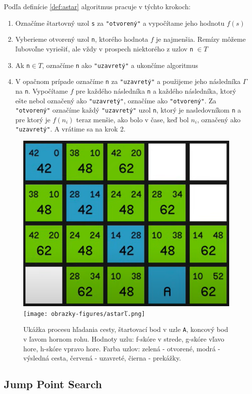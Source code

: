 \noindent
Podľa definície \ref{def:astar} algoritmus pracuje v týchto krokoch:
\begin{enumerate}
    \item Označíme štartovný uzol \verb|s| za \verb|"otvorený"| a vypočítame jeho hodnotu $f(s)$

    \item Vyberieme otvorený uzol \verb|n|, ktorého hodnota $f$ je najmenšia. Remízy môžeme ľubovoľne vyriešiť, ale vždy v prospech niektorého z uzlov \verb|n| $\in T$
    
    \item Ak \verb|n|$ \in T$, označíme \verb|n| ako \verb|"uzavretý"| a ukončíme algoritmus
    
    \item V opačnom prípade označíme \verb|n| za \verb|"uzavretý"| a použijeme jeho následníka
    $\Gamma$ na \verb|n|. Vypočítame $f$ pre každého následníka \verb|n| a
    každého následníka, ktorý ešte nebol označený ako \verb|"uzavretý"|, označíme ako \verb|"otvorený"|.
    Za \verb|"otvorený"| označíme každý \verb|"uzavretý"| uzol \verb|n|, ktorý je nasledovníkom
    \verb|n| a pre ktorý je $f(n_i)$ teraz menšie, ako bolo v čase, keď bol $n_i$,
    označený ako \verb|"uzavretý"|. A vrátime sa na krok 2.
\end{enumerate}

\begin{figure}[H]
    \centering
    \includegraphics[width=0.35\linewidth]{obrazky-figures/astar.png}
    \texttt{[image: obrazky-figures/astarľ.png]}
    \caption{Ukážka procesu hľadania cesty, štartovací bod v uzle \texttt{A}, koncový bod v ľavom hornom rohu. Hodnoty uzlu: f-skóre v strede, g-skóre vľavo hore, h-skóre vpravo hore. Farba uzlov: zelená - otvorené, modrá - výsledná cesta, červená - uzavreté, čierna - prekážky\protect\footnotemark .}
    \label{fig:astar}
\end{figure}


\subsection{Jump Point Search}

